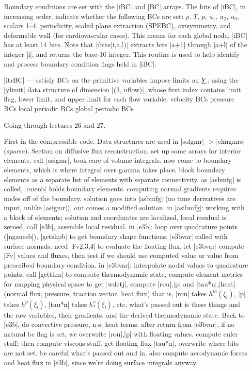 \documentclass[11pt]{article}
\begin{document}
Boundary conditions are set with the |iBC| and |BC| arrays. The bits of |iBC|, in increasing order, indicate whether the following BCs are set: $\rho$, $T$, $p$, $u_1$, $u_2$, $u_3$, scalars 1--4, periodicity, scaled plane extraction (SPEBC), axisymmetry, and deformable wall (for cardiovascular cases). This means for each global node, |iBC| has at least 14 bits. Note that |ibits(i,a,l)| extracts bits |a+1| through |a+l| of the integer |i|, and returns the base-10 integer. This routine is used to help identify and process boundary condition flags held in |iBC|.
\begin{outline}[deep]
\1 |itrBC| --- satisfy BCs on the primitive variables
	\2 impose limits on $\underline{Y}$, using the |ylimit| data structure of dimension |(3, nflow)|, whose first index contains limit flag, lower limit, and upper limit for each flow variable.
	\2 velocity BCs
		\3 
	\2 pressure BCs
		\3 
	\2 local periodic BCs
	\2 global periodic BCs
\end{outline}

Going through lectures 26 and 27.

First in the compressible code.
Data structures are used in |solgmr| -> |elmgmrs| (sparse). Section on diffusive flux reconstruction, set up some arrays for interior elements. call |asigmr|, took care of volume integrals. now come to boundary elements, which is where integral over gamma takes place. block boundary elements as a separate list of elements with separate connectivity. as |asbmfg| is called, |mienb| holds boundary elements. computing normal gradients requires nodes off of the boundary. solution goes into |asbmfg| (no time derivatives are input, unlike |asigmr|), out comes a modified solution. in |asibmfg|: working with a block of elements; solution and coordinates are localized, local residual is zeroed, call |e3b|, assemble local residual. in |e3b|: loop over quadrature points (|ngaussb|), |getshpb| to get boundary shape functions, |e3bvar| called with surface normals, need |Fv{2,3,4}| to evaluate the floating flux, let |e3bvar| compute |Fv| values and fluxes, then test if we should use computed value or value from prescribed boundary condition. in |e3bvar|: interpolate nodal values to quadrature points, call |getthm| to compute thermodynamic state, compute element metrics for mapping physical space to get |wdetj|, compute |rou|,|p| and |tau*n|,|heat| (normal flux, pressure, traction vector, heat flux) that is, |rou| takes $h^m(\xi_l)$, |p| takes $h^p(\xi_l)$, |tau*n| takes $h^v_*(\xi_l)$, etc. what's passed out is these things and the raw variables, their gradients, and the derived thermodynamic state. Back to |e3b|, do convective pressure, n-s, heat terms. after return from |e3bvar|, if no natural bc flag is set, we overwrite |rou|,|p| with floating values. compute euler stuff; then compute viscous stuff. get floating flux |tau*n|, overwrite where bits are not set. be careful what's passed out and in. also compute aerodynamic forces and heat flux in |e3b|, since we're doing surface integrals anyway.
\end{document}
